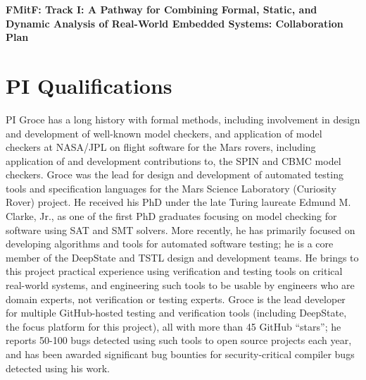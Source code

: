 \documentclass{article}
\begin{document}
\begin{center}
{\Large\sf\textbf{FMitF: Track I: A Pathway for Combining Formal, Static, and
  Dynamic Analysis of Real-World Embedded Systems: Collaboration Plan}}
\end{center}

\section{PI Qualifications}

PI Groce has a long history with formal methods, including involvement in design and development of well-known model checkers, and application of model checkers at NASA/JPL on flight software for the Mars rovers, including application of and development contributions to, the SPIN and CBMC model checkers.  Groce was the lead for design and development of automated testing tools and specification languages for the Mars Science Laboratory (Curiosity Rover) project.  He received his PhD under the late Turing laureate Edmund M. Clarke, Jr., as one of the first PhD graduates focusing on model checking for software using SAT and SMT solvers.  More recently, he has primarily focused on developing algorithms and tools for automated software testing; he is a core member of the DeepState and TSTL design and development teams.  He brings to this project practical experience using verification and testing tools on critical real-world systems, and engineering such tools to be usable by engineers who are domain experts, not verification or testing experts.  Groce is the lead developer for multiple GitHub-hosted testing and verification tools (including DeepState, the focus platform for this project), all with more than 45 GitHub ``stars''; he reports 50-100 bugs detected using such tools to open source projects each year, and has been awarded significant bug bounties for security-critical compiler bugs detected using his work.
\end{document}
